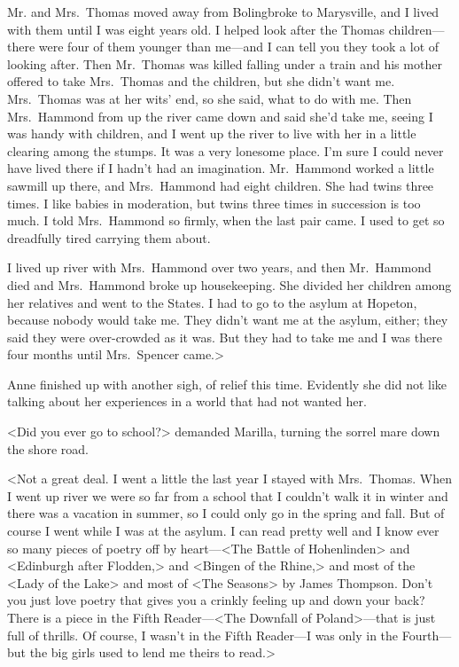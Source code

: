 Mr. and Mrs.~Thomas moved away from Bolingbroke to Marysville, and I lived with them until I was eight years old. I helped look after the Thomas children—there were four of them younger than me—and I can tell you they took a lot of looking after. Then Mr.~Thomas was killed falling under a train and his mother offered to take Mrs.~Thomas and the children, but she didn't want me. Mrs.~Thomas was at her wits' end, so she said, what to do with me. Then Mrs.~Hammond from up the river came down and said she'd take me, seeing I was handy with children, and I went up the river to live with her in a little clearing among the stumps. It was a very lonesome place. I'm sure I could never have lived there if I hadn't had an imagination. Mr.~Hammond worked a little sawmill up there, and Mrs.~Hammond had eight children. She had twins three times. I like babies in moderation, but twins three times in succession is too much. I told Mrs.~Hammond so firmly, when the last pair came. I used to get so dreadfully tired carrying them about.

I lived up river with Mrs.~Hammond over two years, and then Mr.~Hammond died and Mrs.~Hammond broke up housekeeping. She divided her children among her relatives and went to the States. I had to go to the asylum at Hopeton, because nobody would take me. They didn't want me at the asylum, either; they said they were over-crowded as it was. But they had to take me and I was there four months until Mrs.~Spencer came.>

Anne finished up with another sigh, of relief this time. Evidently she did not like talking about her experiences in a world that had not wanted her.

<Did you ever go to school?> demanded Marilla, turning the sorrel mare down the shore road.

<Not a great deal. I went a little the last year I stayed with Mrs.~Thomas. When I went up river we were so far from a school that I couldn't walk it in winter and there was a vacation in summer, so I could only go in the spring and fall. But of course I went while I was at the asylum. I can read pretty well and I know ever so many pieces of poetry off by heart—<The Battle of Hohenlinden> and <Edinburgh after Flodden,> and <Bingen of the Rhine,> and most of the <Lady of the Lake> and most of <The Seasons> by James Thompson. Don't you just love poetry that gives you a crinkly feeling up and down your back? There is a piece in the Fifth Reader—<The Downfall of Poland>—that is just full of thrills. Of course, I wasn't in the Fifth Reader—I was only in the Fourth—but the big girls used to lend me theirs to read.>

